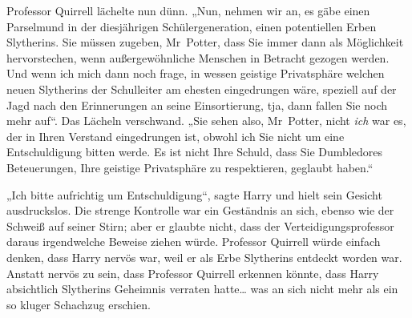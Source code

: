 Professor Quirrell lächelte nun dünn. „Nun, nehmen wir an, es gäbe einen Parselmund in der diesjährigen Schülergeneration, einen potentiellen Erben Slytherins. Sie müssen zugeben, Mr~Potter, dass Sie immer dann als Möglichkeit hervorstechen, wenn außergewöhnliche Menschen in Betracht gezogen werden. Und wenn ich mich dann noch frage, in wessen geistige Privatsphäre welchen neuen Slytherins der Schulleiter am ehesten eingedrungen wäre, speziell auf der Jagd nach den Erinnerungen an seine Einsortierung, tja, dann fallen Sie noch mehr auf“. Das Lächeln verschwand. „Sie sehen also, Mr~Potter, nicht \emph{ich} war es, der in Ihren Verstand eingedrungen ist, obwohl ich Sie nicht um eine Entschuldigung bitten werde. Es ist nicht Ihre Schuld, dass Sie Dumbledores Beteuerungen, Ihre geistige Privatsphäre zu respektieren, geglaubt haben.“

„Ich bitte aufrichtig um Entschuldigung“, sagte Harry und hielt sein Gesicht ausdruckslos. Die strenge Kontrolle war ein Geständnis an sich, ebenso wie der Schweiß auf seiner Stirn; aber er glaubte nicht, dass der Verteidigungsprofessor daraus irgendwelche Beweise ziehen würde. Professor Quirrell würde einfach denken, dass Harry nervös war, weil er als Erbe Slytherins entdeckt worden war. Anstatt nervös zu sein, dass Professor Quirrell erkennen könnte, dass Harry absichtlich Slytherins Geheimnis verraten hatte… was an sich nicht mehr als ein so kluger Schachzug erschien.

